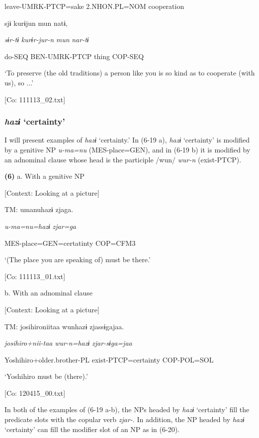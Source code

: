       leave-UMRK-PTCP=sake  2.NHON.PL=NOM  cooperation

      sjɨ  kurɨjun  mun  natɨ,

      \textit{sɨr-tɨ}  \textit{kurɨr-jur-n}  \textit{mun}  \textit{nar-tɨ}

      do-SEQ  BEN-UMRK-PTCP  thing  COP-SEQ

      ‘To preserve (the old traditions) a person like you is so kind as to cooperate (with us), so ...’

      [Co: 111113\_02.txt]

\subsubsection{\textit{hazɨ} ‘certainty’}

I will present examples of \textit{hazɨ} ‘certainty.’ In (6-19 a), \textit{hazɨ} ‘certainty’ is modified by a genitive NP \textit{u-ma=nu} (MES-place=GEN), and in (6-19 b) it is modified by an adnominal clause whose head is the participle /wun/ \textit{wur-n} (exist-PTCP).

\textbf{(6)}  a.  With a genitive NP

    [Context: Looking at a picture]

    TM:  umanuhazɨ  zjaga.

      \textit{u-ma=nu=hazɨ}  \textit{zjar=ga}

      MES-place=GEN=certatinty  COP=CFM3

      ‘(The place you are speaking of) must be there.’

      [Co: 111113\_01.txt]

  b.  With an adnominal clause

    [Context: Looking at a picture]

    TM:  josihironiitaa  wunhazɨ  zjassɨgajaa.

      \textit{josihiro+nii-taa}  \textit{wur-n=hazɨ}  \textit{zjar-sɨga=jaa}

      Yoshihiro+older.brother-PL  exist-PTCP=certainty  COP-POL=SOL

      ‘Yoshihiro must be (there).’

      [Co: 120415\_00.txt]

In both of the examples of (6-19 a-b), the NPs headed by \textit{hazɨ} ‘certainty’ fill the predicate slots with the copular verb \textit{zjar-}. In addition, the NP headed by \textit{hazɨ} ‘certainty’ can fill the modifier slot of an NP as in (6-20).

